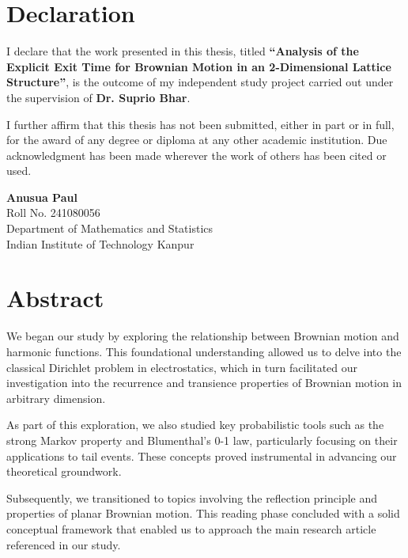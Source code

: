 \documentclass[11pt, a4paper, oneside]{report}
\numberwithin{equation}{section}
\newcommand{\ttitle}{Analysis of the Explicit Exit Time for Brownian Motion in an 
2-Dimensional Lattice Structure}
\newcommand{\authornames}{Anusua Paul}
\newcommand{\supnameA}{Dr. Suprio Bhar}
\newcommand{\univname}{Indian Institute of Technology Kanpur}
\newcommand{\deptname}{Department of Mathematics and Statistics}
\begin{document}
\chapter*{Declaration}

\noindent
I declare that the work presented in this thesis, titled \textbf{\enquote{\ttitle}}, is the outcome of my independent study project carried out under the supervision of \textbf{\supnameA}.

\medskip

I further affirm that this thesis has not been submitted, either in part or in full, for the award of any degree or diploma at any other academic institution. Due acknowledgment has been made wherever the work of others has been cited or used.

\vspace{2cm}

\noindent
\textbf{\authornames} \\
Roll No. 241080056 \\
\deptname \\
\univname



\chapter*{Abstract}

We began our study by exploring the relationship between Brownian motion and harmonic functions. This foundational understanding allowed us to delve into the classical Dirichlet problem in electrostatics, which in turn facilitated our investigation into the recurrence and transience properties of Brownian motion in arbitrary dimension.

\noindent As part of this exploration, we also studied key probabilistic tools such as the strong Markov property and Blumenthal’s 0-1 law, particularly focusing on their applications to tail events. These concepts proved instrumental in advancing our theoretical groundwork.

\noindent Subsequently, we transitioned to topics involving the reflection principle and properties of planar Brownian motion. This reading phase concluded with a solid conceptual framework that enabled us to approach the main research article referenced in our study.
\end{document}
